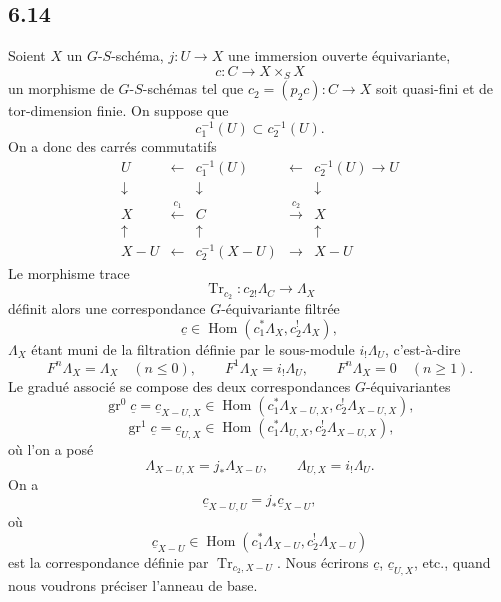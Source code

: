 \documentclass[11pt]{article}
\DeclareMathOperator{\Hom}{Hom}
\providecommand{\Tr}{\operatorname{Tr}}
\providecommand{\Tr}{\operatorname{Tr}}
\providecommand{\Tr}{\operatorname{Tr}}
\providecommand{\Hom}{\operatorname{Hom}}
\providecommand{\Tr}{\operatorname{Tr}}
\providecommand{\Hom}{\operatorname{Hom}}
\providecommand{\Tr}{\operatorname{Tr}}
\begin{document}
\subsection*{6.14}
Soient $X$ un $G$-$S$-schéma, $j:U\to X$ une immersion ouverte équivariante,
\[
c:C\to X\times_SX
\]
un morphisme de $G$-$S$-schémas tel que $c_2=(p_2c):C\to X$ soit quasi-fini et de tor-dimension finie. On suppose que
\[
c_1^{-1}(U)\subset c_2^{-1}(U).
\]
On a donc des carrés commutatifs
\begin{equation}
\begin{array}{ccccc}
U & \longleftarrow & c_1^{-1}(U) & \longleftarrow & c_2^{-1}(U)\longrightarrow U\\
\downarrow && \downarrow && \downarrow\\
X & \xleftarrow{\,c_1\,} & C & \xrightarrow{\,c_2\,} & X\\
\uparrow && \uparrow && \uparrow\\
X-U & \longleftarrow & c_2^{-1}(X-U) & \longrightarrow & X-U
\end{array}
\tag{6.14.1}
\end{equation}
Le morphisme trace
\[
\Tr_{c_2}:c_{2!}\Lambda_C\longrightarrow \Lambda_X
\]
définit alors une correspondance $G$-équivariante filtrée
\begin{equation}
\underline c\in\Hom(c_1^*\Lambda_X,c_2^!\Lambda_X),
\tag{6.14.2}
\end{equation}
$\Lambda_X$ étant muni de la filtration définie par le sous-module $i_!\Lambda_U$, c'est-à-dire
\[
F^n\Lambda_X=\Lambda_X\quad(n\le0),\qquad
F^1\Lambda_X=i_!\Lambda_U,\qquad
F^n\Lambda_X=0\quad(n\ge1).
\]
Le gradué associé se compose des deux correspondances $G$-équivariantes
\[
\operatorname{gr}^0\underline c=\underline c_{X-U,X}
\in\Hom(c_1^*\Lambda_{X-U,X},c_2^!\Lambda_{X-U,X}),
\]
\begin{equation}
\operatorname{gr}^1\underline c=\underline c_{U,X}
\in\Hom(c_1^*\Lambda_{U,X},c_2^!\Lambda_{X-U,X}),
\tag{6.14.3}
\end{equation}
où l'on a posé
\[
\Lambda_{X-U,X}=j_*\Lambda_{X-U},\qquad
\Lambda_{U,X}=i_!\Lambda_U.
\]
On a
\begin{equation}
\underline c_{X-U,U}=j_*\underline c_{X-U},
\tag{6.14.4}
\end{equation}
où
\[
\underline c_{X-U}\in\Hom(c_1^*\Lambda_{X-U},c_2^!\Lambda_{X-U})
\]
est la correspondance définie par $\Tr_{c_2,X-U}$. Nous écrirons $\underline c$, $\underline c_{U,X}$, etc., quand nous voudrons préciser l'anneau de base.
\end{document}
